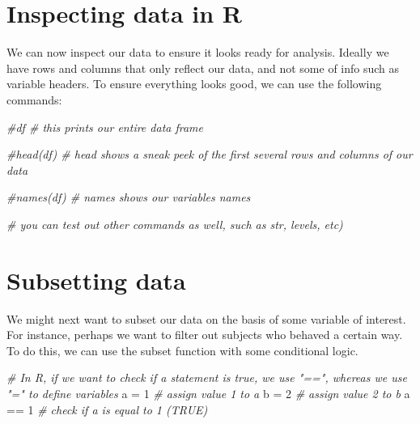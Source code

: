 \documentclass[
]{book}
\newenvironment{Shaded}{\begin{snugshade}}{\end{snugshade}}
\newcommand{\CommentTok}[1]{\textcolor[rgb]{0.56,0.35,0.01}{\textit{#1}}}
\newcommand{\DecValTok}[1]{\textcolor[rgb]{0.00,0.00,0.81}{#1}}
\newcommand{\NormalTok}[1]{#1}
\newcommand{\OtherTok}[1]{\textcolor[rgb]{0.56,0.35,0.01}{#1}}
\newcommand{\SpecialCharTok}[1]{\textcolor[rgb]{0.00,0.00,0.00}{#1}}
\begin{document}
\hypertarget{inspecting-data-in-r}{%
\section{Inspecting data in R}\label{inspecting-data-in-r}}

We can now inspect our data to ensure it looks ready for analysis. Ideally we have rows and columns that only reflect our data, and not some of info such as variable headers. To ensure everything looks good, we can use the following commands:

\begin{Shaded}
\begin{Highlighting}[]
\CommentTok{\#df \# this prints our entire data frame}

\CommentTok{\#head(df) \# \textquotesingle{}head\textquotesingle{} shows a sneak peek of the first several rows and columns of our data}

\CommentTok{\#names(df) \# \textquotesingle{}names\textquotesingle{} shows our variables names}

\CommentTok{\# you can test out other commands as well, such as \textquotesingle{}str\textquotesingle{}, \textquotesingle{}levels\textquotesingle{}, etc)}
\end{Highlighting}
\end{Shaded}

\hypertarget{subsetting-data}{%
\section{Subsetting data}\label{subsetting-data}}

We might next want to subset our data on the basis of some variable of interest. For instance, perhaps we want to filter out subjects who behaved a certain way. To do this, we can use the subset function with some conditional logic.

\begin{Shaded}
\begin{Highlighting}[]
\CommentTok{\# In R, if we want to check if a statement is true, we use "==", whereas we use "=" to define variables}
\NormalTok{  a }\OtherTok{=} \DecValTok{1} \CommentTok{\# assign value 1 to a}
\NormalTok{  b }\OtherTok{=} \DecValTok{2} \CommentTok{\# assign value 2 to b}
\NormalTok{  a }\SpecialCharTok{==} \DecValTok{1} \CommentTok{\# check if a is equal to 1 (TRUE)}
\end{Highlighting}
\end{Shaded}
\end{document}
